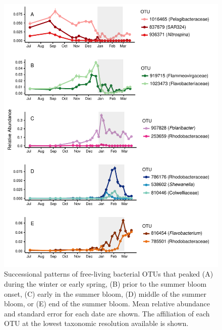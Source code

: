 \begin{figure}[htbp] 
\centering 
\includegraphics[width=\textwidth]{Chapter_3_SWI/Figures/Figure_3_OTU_succession_post_network_analysis} 
\caption[Five classes of successional patterns observed for individual OTUs over the nine-month time series.]{Successional patterns of free-living bacterial OTUs that peaked (A) during the winter or early spring, (B) prior to the summer bloom onset, (C) early in the summer bloom, (D) middle of the summer bloom, or (E) end of the summer bloom. Mean relative abundance and standard error for each date are shown. The affiliation of each OTU at the lowest taxonomic resolution available is shown.}
\label{fig:otu_succession} 
\end{figure}

